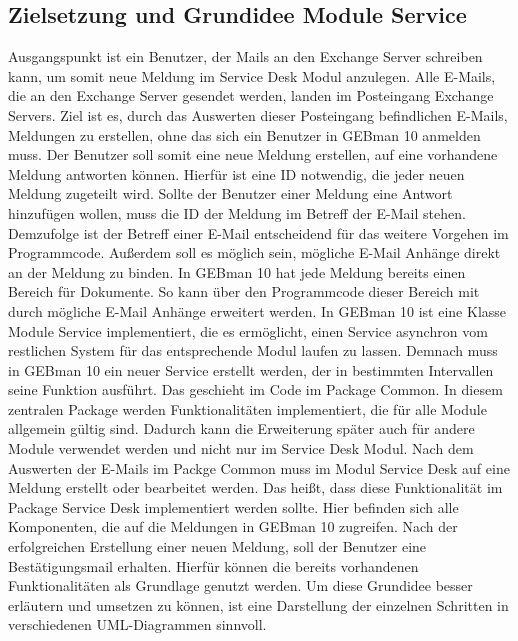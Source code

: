 \subsection{Zielsetzung und Grundidee Module Service }
\noindent
Ausgangspunkt ist ein Benutzer, der Mails an den Exchange Server schreiben kann, um somit neue Meldung im Service Desk Modul anzulegen. Alle E-Mails, die an den Exchange Server gesendet werden, landen im Posteingang Exchange Servers. Ziel ist es, durch das Auswerten dieser Posteingang befindlichen E-Mails, Meldungen zu erstellen, ohne das sich ein Benutzer in GEBman 10 anmelden muss. Der Benutzer soll somit eine neue Meldung erstellen, auf eine vorhandene Meldung antworten können. Hierfür ist eine ID notwendig, die jeder neuen Meldung zugeteilt wird. Sollte der Benutzer einer Meldung eine Antwort hinzufügen wollen, muss die ID der Meldung im Betreff der E-Mail stehen. Demzufolge ist der Betreff einer E-Mail entscheidend für das weitere Vorgehen im Programmcode. Außerdem soll es möglich sein, mögliche E-Mail Anhänge direkt an der Meldung zu binden. In GEBman 10 hat jede Meldung bereits einen Bereich für Dokumente. So kann über den Programmcode dieser Bereich mit durch mögliche E-Mail Anhänge erweitert werden. \newline 
In GEBman 10 ist eine Klasse Module Service implementiert, die es ermöglicht, einen Service asynchron vom restlichen System für das entsprechende Modul laufen zu lassen. Demnach muss in GEBman 10 ein neuer Service erstellt werden, der in bestimmten Intervallen seine Funktion ausführt. Das geschieht im Code im Package Common. In diesem zentralen Package werden Funktionalitäten implementiert, die für alle Module allgemein gültig sind. Dadurch kann die Erweiterung später auch für andere Module verwendet werden und nicht nur im Service Desk Modul.\newline
Nach dem Auswerten der E-Mails im Packge Common muss im Modul Service Desk auf eine Meldung erstellt oder bearbeitet werden. Das heißt, dass diese Funktionalität im Package Service Desk implementiert werden sollte. Hier befinden sich alle Komponenten, die auf die Meldungen in GEBman 10 zugreifen. Nach der erfolgreichen Erstellung einer neuen Meldung, soll der Benutzer eine Bestätigungsmail erhalten. Hierfür können die bereits vorhandenen Funktionalitäten als Grundlage genutzt werden.\newline
Um diese Grundidee besser erläutern und umsetzen zu können, ist eine Darstellung der einzelnen Schritten in verschiedenen UML-Diagrammen sinnvoll.

